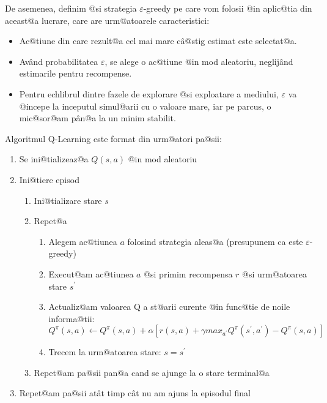  De asemenea, definim @si strategia $\varepsilon$-greedy pe care vom folosii @in aplic@tia din aceast@a lucrare, care are urm@atoarele caracteristici:

\begin{itemize}
	\item Ac@tiune din care rezult@a cel mai mare c\^ a@stig estimat este selectat@a.
	\item Av\^ and probabilitatea $\varepsilon$, se alege o ac@tiune @in mod aleatoriu, neglij\^and estimarile pentru recompense.
	\item Pentru echlibrul dintre fazele de explorare @si exploatare a mediului, $\varepsilon$ va @incepe la inceputul simul@arii cu o valoare mare, iar pe parcus, o mic@sor@am p\^ an@a la un minim stabilit.
\end{itemize}

Algoritmul Q-Learning este format din urm@atori pa@sii:

\begin{enumerate}
	\item Se ini@tializeaz@a $Q(s, a)$ @in mod aleatoriu
	\item Ini@tiere episod
	\begin{enumerate}[1.]
		\item Ini@tializare stare $s$
		\item Repet@a
		\begin{enumerate}[1.]
			\item Alegem ac@tiunea $a$ folosind strategia aleas@a (presupunem ca este $\varepsilon$-greedy)
			\item Execut@am ac@tiunea $a$ @si primim recompensa $r$ @si urm@atoarea stare $s^{\prime}$
			\item Actualiz@am valoarea Q a st@arii curente @in func@tie de noile informa@tii: \begin{equation}
			Q^{\pi}(s, a) \leftarrow Q^{\pi}(s, a) + \alpha \left[ r(s,a) + \gamma max_{a^{\prime}} Q^{\pi}(s^{\prime}, a^{\prime}) - Q^{\pi}(s, a) \right]
\end{equation}			
			\item Trecem la urm@atoarea stare: $s = s^{\prime}$
		\end{enumerate}
		\item Repet@am pa@sii pan@a cand se ajunge la o stare terminal@a
	\end{enumerate}	
	\item Repet@am pa@sii at\^at timp c\^ at nu am ajuns la episodul final	
\end{enumerate}

